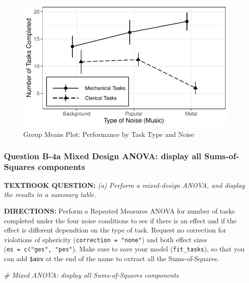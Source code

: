 \documentclass[
]{article}
\newenvironment{Shaded}{\begin{snugshade}}{\end{snugshade}}
\newcommand{\CommentTok}[1]{\textcolor[rgb]{0.56,0.35,0.01}{\textit{#1}}}
\begin{document}
\begin{figure}

{\centering \includegraphics{Chapter-16-Assignment-R-Skeleton_files/figure-latex/unnamed-chunk-5-1} 

}

\caption{Group Means Plot: Performance by Task Type and Noise}\label{fig:unnamed-chunk-5}
\end{figure}

\clearpage

\hypertarget{question-b-4a-mixed-design-anova-display-all-sums-of-squares-components}{%
\subsubsection{Question B-4a Mixed Design ANOVA: display all
Sums-of-Squares
components}\label{question-b-4a-mixed-design-anova-display-all-sums-of-squares-components}}

\textbf{TEXTBOOK QUESTION:} \emph{(a) Perform a mixed-design ANOVA, and
display the results in a summary table.}

\textbf{DIRECTIONS:} Perform a Repeated Measures ANOVA for number of
tasks completed under the four noise conditions to see if there is an
effect and if the effect is different dependtion on the type of task.
Request no correction for violations of sphericity
(\texttt{correction\ =\ "none"}) and both effect sizes
(\texttt{es\ =\ c("ges",\ "pes"}). Make sure to save your model
(\texttt{fit\_tasks}), so that you can add \texttt{\$aov} at the end of
the name to extract all the Sums-of-Squares.

\begin{Shaded}
\begin{Highlighting}[]
\CommentTok{# Mixed ANOVA: display all Sums-of-Squares components}
\end{Highlighting}
\end{Shaded}
\end{document}
